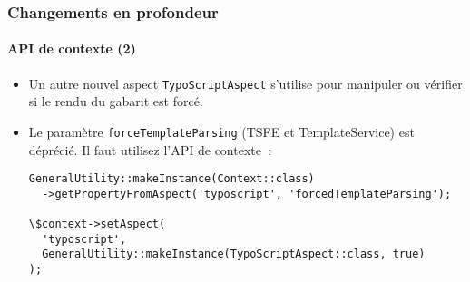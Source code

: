 
\begin{frame}[fragile]
	\frametitle{Changements en profondeur}
	\framesubtitle{API de contexte (2)}

	\lstset{basicstyle=\tiny\ttfamily}

	\begin{itemize}

		\item Un autre nouvel aspect \texttt{TypoScriptAspect} s'utilise pour manipuler ou vérifier si
			le rendu du gabarit est forcé.

		\item Le paramètre \texttt{forceTemplateParsing} (TSFE et TemplateService) est déprécié.
			Il faut utilisez l'API de contexte~:
\begin{lstlisting}
GeneralUtility::makeInstance(Context::class)
  ->getPropertyFromAspect('typoscript', 'forcedTemplateParsing');

\$context->setAspect(
  'typoscript',
  GeneralUtility::makeInstance(TypoScriptAspect::class, true)
);
\end{lstlisting}

	\end{itemize}

\end{frame}

%
%
%
%
%
%
%

